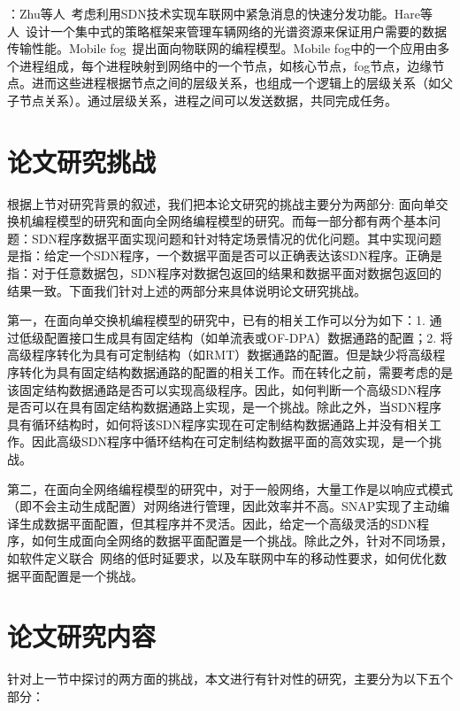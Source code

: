 ：Zhu等人~\cite{zhu2018sdn}考虑利用SDN技术实现车联网中紧急消息的快速分发功能。Hare等人~\cite{hare2012policy}设计一个集中式的策略框架来管理车辆网络的光谱资源来保证用户需要的数据传输性能。Mobile fog~\cite{hong2013mobile}提出面向物联网的编程模型。Mobile fog中的一个应用由多个进程组成，每个进程映射到网络中的一个节点，如核心节点，fog节点，边缘节点。进而这些进程根据节点之间的层级关系，也组成一个逻辑上的层级关系（如父子节点关系）。通过层级关系，进程之间可以发送数据，共同完成任务。


\section{论文研究挑战}

根据上节对研究背景的叙述，我们把本论文研究的挑战主要分为两部分: 面向单交换机编程模型的研究和面向全网络编程模型的研究。而每一部分都有两个基本问题：SDN程序数据平面实现问题和针对特定场景情况的优化问题。其中实现问题是指：给定一个SDN程序，一个数据平面是否可以正确表达该SDN程序。正确是指：对于任意数据包，SDN程序对数据包返回的结果和数据平面对数据包返回的结果一致。下面我们针对上述的两部分来具体说明论文研究挑战。

第一，在面向单交换机编程模型的研究中，已有的相关工作可以分为如下：1. 通过低级配置接口生成具有固定结构（如单流表或OF-DPA）数据通路的配置；2. 将高级程序转化为具有可定制结构（如RMT）数据通路的配置。但是缺少将高级程序转化为具有固定结构数据通路的配置的相关工作。而在转化之前，需要考虑的是该固定结构数据通路是否可以实现高级程序。因此，如何判断一个高级SDN程序是否可以在具有固定结构数据通路上实现，是一个挑战。除此之外，当SDN程序具有循环结构时，如何将该SDN程序实现在可定制结构数据通路上并没有相关工作。因此高级SDN程序中循环结构在可定制结构数据平面的高效实现，是一个挑战。

第二，在面向全网络编程模型的研究中，对于一般网络，大量工作是以响应式模式（即不会主动生成配置）对网络进行管理，因此效率并不高。SNAP实现了主动编译生成数据平面配置，但其程序并不灵活。因此，给定一个高级灵活的SDN程序，如何生成面向全网络的数据平面配置是一个挑战。除此之外，针对不同场景，如软件定义联合~\cite{mishra2017comparing}网络的低时延要求，以及车联网中车的移动性要求，如何优化数据平面配置是一个挑战。

\section{论文研究内容}

针对上一节中探讨的两方面的挑战，本文进行有针对性的研究，主要分为以下五个部分：

